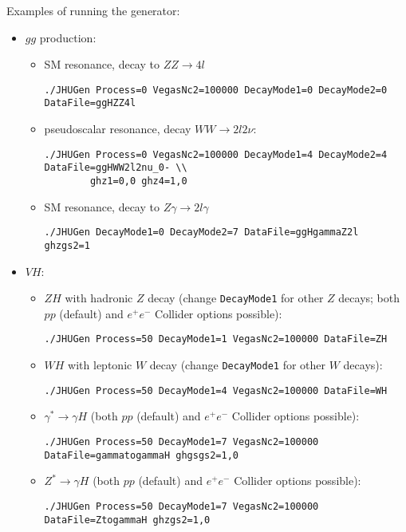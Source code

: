 \documentclass[aps,superscriptaddress,nofootinbib]{revtex4}
\begin{document}
Examples of running the generator:
\begin{itemize}
\item $gg$ production:
\begin{itemize}
\item SM resonance, decay to $ZZ\to 4l$
\begin{verbatim}
./JHUGen Process=0 VegasNc2=100000 DecayMode1=0 DecayMode2=0 DataFile=ggHZZ4l
\end{verbatim}
\item pseudoscalar resonance, decay $WW\to 2l2\nu$:
\begin{verbatim}
./JHUGen Process=0 VegasNc2=100000 DecayMode1=4 DecayMode2=4 DataFile=ggHWW2l2nu_0- \\
		ghz1=0,0 ghz4=1,0
\end{verbatim}
\item SM resonance, decay to $Z\gamma\to 2l\gamma$
\begin{verbatim}
./JHUGen DecayMode1=0 DecayMode2=7 DataFile=ggHgammaZ2l ghzgs2=1
\end{verbatim}
\end{itemize}
\item $VH$:
\begin{itemize}
\item $ZH$ with hadronic $Z$ decay (change \verb|DecayMode1| for other $Z$ decays; both $pp$ (default) and $e^+e^-$ Collider options possible):
\begin{verbatim}
./JHUGen Process=50 DecayMode1=1 VegasNc2=100000 DataFile=ZH
\end{verbatim}
\item $WH$ with leptonic $W$ decay (change \verb|DecayMode1| for other $W$ decays):
\begin{verbatim}
./JHUGen Process=50 DecayMode1=4 VegasNc2=100000 DataFile=WH
\end{verbatim}
\item $\gamma^*\to\gamma H$ (both $pp$ (default) and $e^+e^-$ Collider options possible):
\begin{verbatim}
./JHUGen Process=50 DecayMode1=7 VegasNc2=100000 DataFile=gammatogammaH ghgsgs2=1,0
\end{verbatim}
\item $Z^*\to\gamma H$ (both $pp$ (default) and $e^+e^-$ Collider options possible):
\begin{verbatim}
./JHUGen Process=50 DecayMode1=7 VegasNc2=100000 DataFile=ZtogammaH ghzgs2=1,0
\end{verbatim}
\end{itemize}

\end{itemize}
\end{document}
